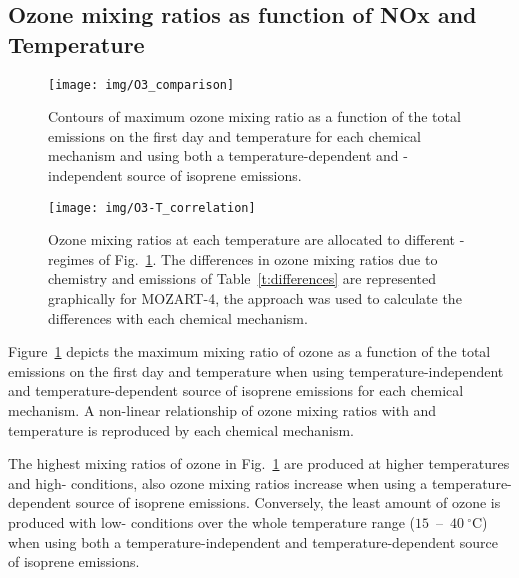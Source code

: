 \subsection{Ozone mixing ratios as function of NOx and Temperature} \label{ss:r_contours}

\begin{figure}%
    \centering%
    \caption{Contours of maximum ozone mixing ratio as a function of the total  emissions on the first day and temperature for each chemical mechanism and using both a temperature-dependent and -independent source of isoprene emissions.}
    \label{f:ozone_contours}%
    \texttt{[image: img/O3\_comparison]}
\end{figure}

\begin{figure}%
    \centering%
    \caption{Ozone mixing ratios at each temperature are allocated to different -regimes of Fig.~\ref{f:ozone_contours}. The differences in ozone mixing ratios due to chemistry and emissions of Table~\ref{t:differences} are represented graphically for MOZART-4, the approach was used to calculate the differences with each chemical mechanism.}%
    \label{f:O3-T}%
    \texttt{[image: img/O3-T\_correlation]}%
\end{figure}

\begin{table}%
    \centering%
    \caption{Increase in ozone mixing ratio (ppbv) due to chemistry and emissions at $40$~$^{\circ}$C from reference temperature ($20$~$^{\circ}$C) in the -regimes of Fig.~\ref{f:ozone_contours}.}%
    \label{t:differences}%
    
\end{table}

Figure~\ref{f:ozone_contours} depicts the maximum mixing ratio of ozone as a function of the total  emissions on the first day and temperature when using temperature-independent and temperature-dependent source of isoprene emissions for each chemical mechanism.
A non-linear relationship of ozone mixing ratios with  and temperature is reproduced by each chemical mechanism.

The highest mixing ratios of ozone in Fig.~\ref{f:ozone_contours} are produced at higher temperatures and high- conditions, also ozone mixing ratios increase when using a temperature-dependent source of isoprene emissions.
Conversely, the least amount of ozone is produced with low- conditions over the whole temperature range ($15$~--~$40~^{\circ}$C) when using both a temperature-independent and temperature-dependent source of isoprene emissions.

